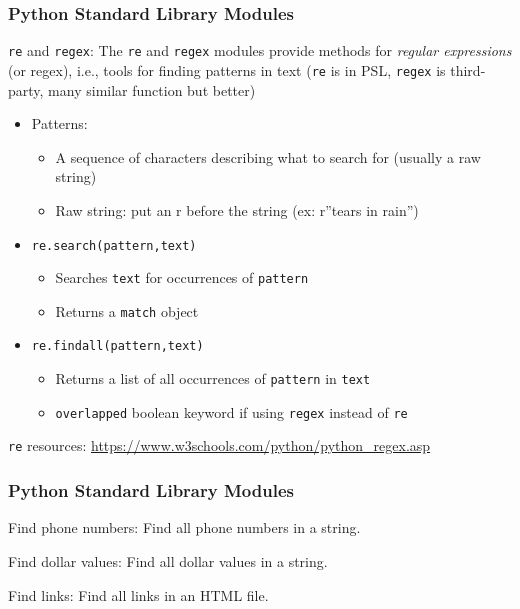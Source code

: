 \documentclass{beamer}
\newcommand{\code}[1]{\texttt{#1}}
\begin{document}
\begin{frame}	
	\frametitle{Python Standard Library Modules}
	
	\begin{block}{\code{re} and \code{regex}:}
		The \code{re} and \code{regex} modules provide methods for \emph{regular expressions} (or regex), i.e., tools for finding patterns in text (\code{re} is in PSL, \code{regex} is third-party, many similar function but better)
		\begin{itemize}
			\item Patterns:
			\begin{itemize}
				\item A sequence of characters describing what to search for (usually a raw string)
				\item Raw string: put an r before the string (ex: r''tears in rain'')
			\end{itemize}
			\item \code{re.search(pattern,text)}
			\begin{itemize}
				\item Searches \code{text} for occurrences of \code{pattern}
				\item Returns a \code{match} object
			\end{itemize}
			\item \code{re.findall(pattern,text)}
			\begin{itemize}
				\item Returns a list of all occurrences of \code{pattern} in \code{text}
				\item \code{overlapped} boolean keyword if using \code{regex} instead of \code{re}
			\end{itemize}
		\end{itemize}
		\code{re} resources: \href{https://www.w3schools.com/python/python\_regex.asp}{https://www.w3schools.com/python/python\_regex.asp}
	\end{block}
	
\end{frame}

\begin{frame}	
	\frametitle{Python Standard Library Modules}
	
	\begin{exampleblock}{Find phone numbers:}
		Find all phone numbers in a string.
	\end{exampleblock}
	
	\begin{exampleblock}{Find dollar values:}
		Find all dollar values in a string.
	\end{exampleblock}
	
	\begin{exampleblock}{Find links:}
		Find all links in an HTML file.
	\end{exampleblock}
	
\end{frame}
\end{document}
